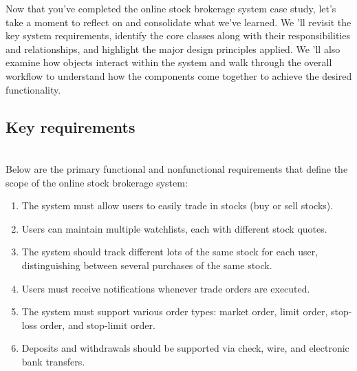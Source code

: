 

Now that you've completed the online stock brokerage system case study, let's take a moment to reflect on and consolidate what we've learned. We 'll revisit the key system requirements, identify the core classes along with their responsibilities and relationships, and highlight the major design principles applied. We
'll also examine how objects interact within the system and walk through the overall workflow to understand how the components come together to achieve the desired functionality.

\subsection{Key requirements}\label{sDZ0kvfHuB419ldqGPfqP}
\\
Below are the primary functional and nonfunctional requirements that define the scope of the online stock brokerage system:

\begin{enumerate}
\item
\protect{}\label{htczQtawn-pEBFr_HgX_6}
The system must allow users to easily trade in stocks (buy or sell stocks).
\item
\protect{}\label{NnIZnL-KMNgxz1jGhQz4m}
Users can maintain multiple watchlists, each with different stock quotes.
\item
\protect{}\label{nBmKgbBFMmVjr7NClzZAE}
The system should track different lots of the same stock for each user, distinguishing between several purchases of the same stock.
\item
\protect{}\label{KwVbecX5FlCB_DxzN7Qqy}
Users must receive notifications whenever trade orders are executed.
\item
\protect{}\label{dKy428afvHceFZmpYCfPt}
The system must support various order types: market order, limit order, stop-loss order, and stop-limit order.
\item
\protect{}\label{r47WmiwYpgZWXwcLSRane}
Deposits and withdrawals should be supported via check, wire, and electronic bank transfers.
\end{enumerate}

